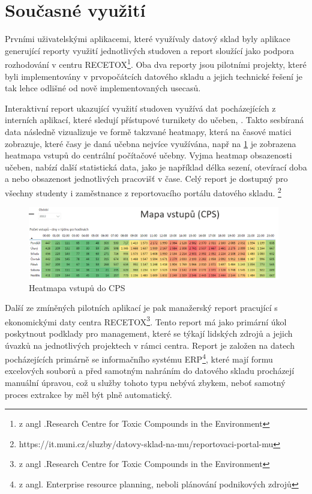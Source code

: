 \documentclass[
  digital,     %
  twoside,     %
  lof,         %
  lot,         %
]{fithesis4}
\begin{document}
\section{Současné využití}
Prvními uživatelskými aplikacemi, které využívaly datový sklad byly aplikace generující reporty využití jednotlivých studoven a report sloužící jako podpora rozhodování v centru RECETOX\footnote{z angl .Research Centre for Toxic Compounds in the Environment}. Oba dva reporty jsou pilotními projekty, které byli implementovány v prvopočátcích datového skladu a jejich technické řešení je tak lehce odlišné od nově implementovaných usecasů. 

Interaktivní report ukazující využití studoven využívá dat pocházejících z interních aplikací, které sledují přístupové turnikety do učeben, . Takto sesbíraná data následně vizualizuje ve formě takzvané heatmapy, která na časové matici zobrazuje, které časy je daná učebna nejvíce využívána, např na \ref{fig:cps} je zobrazena heatmapa vstupů do centrální počítačové učebny. Vyjma heatmap obsazenosti učeben, nabízí další statistická data, jako je například délka sezení, otevírací doba a nebo obsazenost jednotlivých pracovišť v čase. Celý report je dostupný pro všechny studenty i zaměstnance z reportovacího portálu datového skladu. \footnote{https://it.muni.cz/sluzby/datovy-sklad-na-mu/reportovaci-portal-mu}

    \begin{figure}[t]
        \begin{center}
            \includegraphics[width=11cm]{img/ucebny.png}
        \end{center}
        \caption{Heatmapa vstupů do CPS}
        \label{fig:cps}
    \end{figure} 
 
Další ze zmíněných pilotních aplikací je pak manažerský report pracující s ekonomickými daty centra RECETOX\footnote{z angl .Research Centre for Toxic Compounds in the Environment}. Tento report má jako primární úkol poskytnout podklady pro management, které se týkají lidských zdrojů a jejich úvazků na jednotlivých projektech v rámci centra. Report je  založen na datech pocházejících primárně se informačního systému ERP\footnote{z angl. Enterprise resource planning, neboli plánování podnikových zdrojů}, které mají formu excelových souborů a před samotným nahráním do datového skladu procházejí manuální úpravou, což u služby tohoto typu nebývá zbykem, neboť samotný proces extrakce by měl být plně automatický. 
\end{document}
